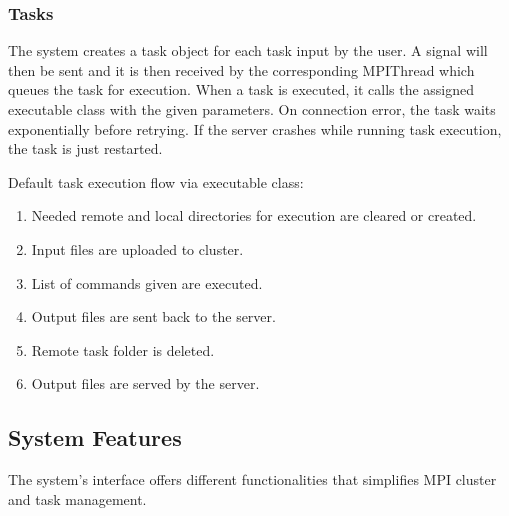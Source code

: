		\subsubsection{Tasks} 
		The system creates a task object for each task input by the user. A signal will then be sent and it is then received by the corresponding MPIThread which queues the task for execution. When a task is executed, it calls the assigned executable class with the given parameters. On connection error, the task waits exponentially before retrying. If the server crashes while running task execution, the task is just restarted.				
		
		 Default task execution flow via executable class:			
		\begin{enumerate}
			\item  Needed remote and local directories for execution are cleared or created.
			\item  Input files are uploaded to cluster.
			\item  List of commands given are executed.
			\item  Output files are sent back to the server.
			\item  Remote task folder is deleted.
			\item  Output files are served by the server.
		\end{enumerate}	

	\subsection{System Features}
	The system's interface offers different functionalities that simplifies MPI cluster and task management.
		
